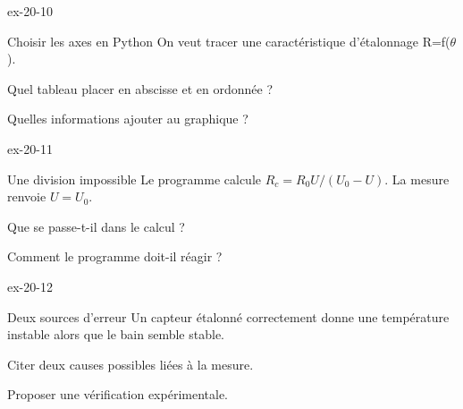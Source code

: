 \begin{blocLivre}{ex-20-10}\begin{exercice}[3]{Choisir les axes en Python}
On veut tracer une caractéristique d’étalonnage R=f($\theta$).
\begin{questions}
\item Quel tableau placer en abscisse et en ordonnée ?
\item Quelles informations ajouter au graphique ?
\end{questions}
\end{exercice}\end{blocLivre}
\begin{blocLivre}{ex-20-11}\begin{exercice}[3]{Une division impossible}
Le programme calcule $R_c=R_0U/(U_0-U)$. La mesure renvoie $U=U_0$.
\begin{questions}
\item Que se passe-t-il dans le calcul ?
\item Comment le programme doit-il réagir ?
\end{questions}
\end{exercice}\end{blocLivre}
\begin{blocLivre}{ex-20-12}\begin{exercice}[3]{Deux sources d’erreur}
Un capteur étalonné correctement donne une température instable alors que le bain semble stable.
\begin{questions}
\item Citer deux causes possibles liées à la mesure.
\item Proposer une vérification expérimentale.
\end{questions}
\end{exercice}\end{blocLivre}

